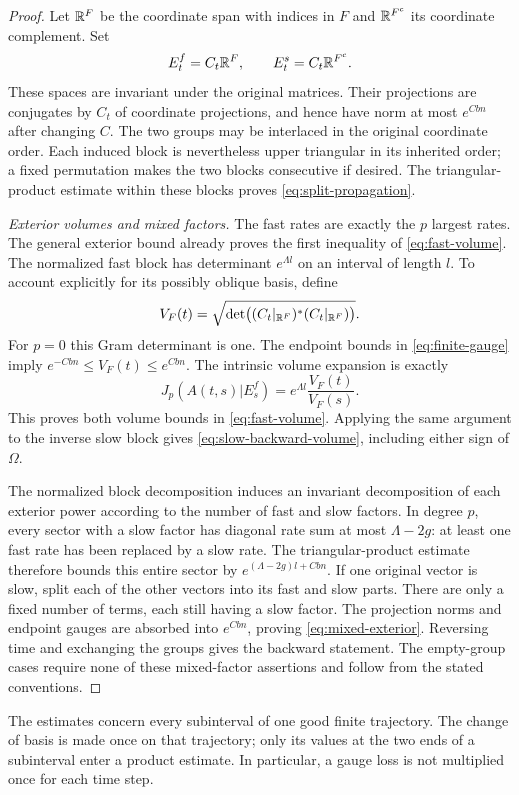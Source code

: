 \begin{proof}
Let $\mathbb R^F$ be the coordinate span with indices in $F$ and
$\mathbb R^{F^c}$ its coordinate complement.  Set
\[
 E_t^f=C_t\mathbb R^F,\qquad E_t^s=C_t\mathbb R^{F^c}.
\]
These spaces are invariant under the original matrices.
Their projections are conjugates by $C_t$ of coordinate projections,
and hence have norm at most $e^{Cbn}$ after changing $C$.
The two groups may be interlaced in the original coordinate order.
Each induced block is nevertheless upper triangular in its inherited
order; a fixed permutation makes the two blocks consecutive if desired.
The triangular-product estimate within these blocks proves
\eqref{eq:split-propagation}.

\emph{Exterior volumes and mixed factors.}
The fast rates are exactly the $p$ largest rates.  The general exterior
bound already proves the first inequality of \eqref{eq:fast-volume}.
The normalized fast block has determinant $e^{\Lambda l}$ on an
interval of length $l$.
To account explicitly for its possibly oblique basis, define
\[
 V_F(t)=
 \sqrt{\det\bigl((C_t|_{\mathbb R^F})^*(C_t|_{\mathbb R^F})\bigr)}.
\]
For $p=0$ this Gram determinant is one.  The endpoint bounds in
\eqref{eq:finite-gauge} imply
$e^{-Cbn}\leq V_F(t)\leq e^{Cbn}$.
The intrinsic volume expansion is exactly
\[
 J_p(A(t,s)|E_s^f)
       =e^{\Lambda l}\frac{V_F(t)}{V_F(s)}.
\]
This proves both volume bounds in \eqref{eq:fast-volume}.
Applying the same argument to the inverse slow block gives
\eqref{eq:slow-backward-volume}, including either sign of $\Omega$.

The normalized block decomposition induces an invariant decomposition
of each exterior power according to the number of fast and slow
factors.  In degree $p$, every sector with a slow factor has diagonal
rate sum at most $\Lambda-2g$: at least one fast rate has been
replaced by a slow rate.
The triangular-product estimate therefore bounds this entire sector
by $e^{(\Lambda-2g)l+Cbn}$.
If one original vector is slow, split each of the other vectors into
its fast and slow parts.  There are only a fixed number of terms, each
still having a slow factor.  The projection norms and endpoint gauges
are absorbed into $e^{Cbn}$, proving \eqref{eq:mixed-exterior}.
Reversing time and exchanging the groups gives the backward statement.
The empty-group cases require none of these mixed-factor assertions
and follow from the stated conventions.
\end{proof}

The estimates concern every subinterval of one good finite trajectory.
The change of basis is made once on that trajectory; only its values
at the two ends of a subinterval enter a product estimate.
In particular, a gauge loss is not multiplied once for each time step.

